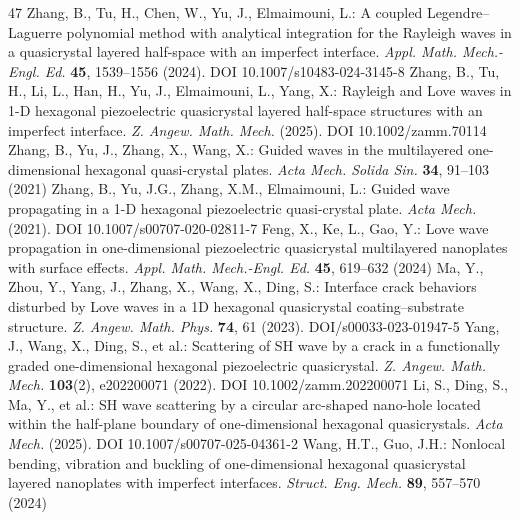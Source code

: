 \documentclass[11pt]{article}
\begin{document}
\begin{thebibliography}{47}
 Zhang, B., Tu, H., Chen, W., Yu, J., Elmaimouni, L.: A coupled Legendre--Laguerre polynomial method with analytical integration for the Rayleigh waves in a quasicrystal layered half-space with an imperfect interface. \emph{Appl. Math. Mech.-Engl. Ed.} \textbf{45}, 1539--1556 (2024). DOI 10.1007/s10483-024-3145-8
 Zhang, B., Tu, H., Li, L., Han, H., Yu, J., Elmaimouni, L., Yang, X.: Rayleigh and Love waves in 1-D hexagonal piezoelectric quasicrystal layered half-space structures with an imperfect interface. \emph{Z. Angew. Math. Mech.} (2025). DOI 10.1002/zamm.70114
 Zhang, B., Yu, J., Zhang, X., Wang, X.: Guided waves in the multilayered one-dimensional hexagonal quasi-crystal plates. \emph{Acta Mech. Solida Sin.} \textbf{34}, 91--103 (2021)
 Zhang, B., Yu, J.G., Zhang, X.M., Elmaimouni, L.: Guided wave propagating in a 1-D hexagonal piezoelectric quasi-crystal plate. \emph{Acta Mech.} (2021). DOI 10.1007/s00707-020-02811-7
 Feng, X., Ke, L., Gao, Y.: Love wave propagation in one-dimensional piezoelectric quasicrystal multilayered nanoplates with surface effects. \emph{Appl. Math. Mech.-Engl. Ed.} \textbf{45}, 619--632 (2024)
 Ma, Y., Zhou, Y., Yang, J., Zhang, X., Wang, X., Ding, S.: Interface crack behaviors disturbed by Love waves in a 1D hexagonal quasicrystal coating--substrate structure. \emph{Z. Angew. Math. Phys.} \textbf{74}, 61 (2023). DOI/s00033-023-01947-5
 Yang, J., Wang, X., Ding, S., et al.: Scattering of SH wave by a crack in a functionally graded one-dimensional hexagonal piezoelectric quasicrystal. \emph{Z. Angew. Math. Mech.} \textbf{103}(2), e202200071 (2022). DOI 10.1002/zamm.202200071
 Li, S., Ding, S., Ma, Y., et al.: SH wave scattering by a circular arc-shaped nano-hole located within the half-plane boundary of one-dimensional hexagonal quasicrystals. \emph{Acta Mech.} (2025). DOI 10.1007/s00707-025-04361-2
 Wang, H.T., Guo, J.H.: Nonlocal bending, vibration and buckling of one-dimensional hexagonal quasicrystal layered nanoplates with imperfect interfaces. \emph{Struct. Eng. Mech.} \textbf{89}, 557--570 (2024)
\end{thebibliography}
\end{document}
